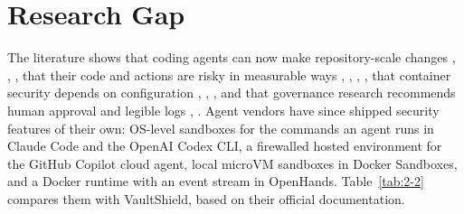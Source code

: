 \documentclass[12pt,a4paper,oneside]{report}
\begin{document}
\addtocounter{table}{-1}
\par\medskip

\endgroup

\section{Research Gap}\label{research-gap}

The literature shows that coding agents can now make repository-scale changes \cite{ref2}, \cite{ref3}, \cite{ref4}, that their code and actions are risky in measurable ways \cite{ref5}, \cite{ref6}, \cite{ref7}, \cite{ref8}, that container security depends on configuration \cite{ref11}, \cite{ref12}, \cite{ref13}, and that governance research recommends human approval and legible logs \cite{ref9}, \cite{ref10}. Agent vendors have since shipped security features of their own: OS-level sandboxes for the commands an agent runs in Claude Code and the OpenAI Codex CLI, a firewalled hosted environment for the GitHub Copilot cloud agent, local microVM sandboxes in Docker Sandboxes, and a Docker runtime with an event stream in OpenHands. Table~\ref{tab:2-2} compares them with VaultShield, based on their official documentation.
\end{document}
